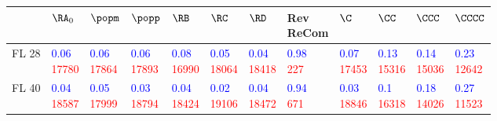 \begin{tabular}{llllllllllll}
\toprule
 & $\RA_0$ & $\popm$ & $\popp$ & $\RB$ & $\RC$ & $\RD$ & \makecell{Rev \\ ReCom} & $\C$ & $\CC$ & $\CCC$ & $\CCCC$ \\
\midrule
FL 28 & \makecell{\textcolor{blue}{0.06} \\ \textcolor{red}{17780}} & \makecell{\textcolor{blue}{0.06} \\ \textcolor{red}{17864}} & \makecell{\textcolor{blue}{0.06} \\ \textcolor{red}{17893}} & \makecell{\textcolor{blue}{0.08} \\ \textcolor{red}{16990}} & \makecell{\textcolor{blue}{0.05} \\ \textcolor{red}{18064}} & \makecell{\textcolor{blue}{0.04} \\ \textcolor{red}{18418}} & \makecell{\textcolor{blue}{0.98} \\ \textcolor{red}{227}} & \makecell{\textcolor{blue}{0.07} \\ \textcolor{red}{17453}} & \makecell{\textcolor{blue}{0.13} \\ \textcolor{red}{15316}} & \makecell{\textcolor{blue}{0.14} \\ \textcolor{red}{15036}} & \makecell{\textcolor{blue}{0.23} \\ \textcolor{red}{12642}} \\
FL 40 & \makecell{\textcolor{blue}{0.04} \\ \textcolor{red}{18587}} & \makecell{\textcolor{blue}{0.05} \\ \textcolor{red}{17999}} & \makecell{\textcolor{blue}{0.03} \\ \textcolor{red}{18794}} & \makecell{\textcolor{blue}{0.04} \\ \textcolor{red}{18424}} & \makecell{\textcolor{blue}{0.02} \\ \textcolor{red}{19106}} & \makecell{\textcolor{blue}{0.04} \\ \textcolor{red}{18472}} & \makecell{\textcolor{blue}{0.94} \\ \textcolor{red}{671}} & \makecell{\textcolor{blue}{0.03} \\ \textcolor{red}{18846}} & \makecell{\textcolor{blue}{0.1} \\ \textcolor{red}{16318}} & \makecell{\textcolor{blue}{0.18} \\ \textcolor{red}{14026}} & \makecell{\textcolor{blue}{0.27} \\ \textcolor{red}{11523}} \\

\end{tabular}
